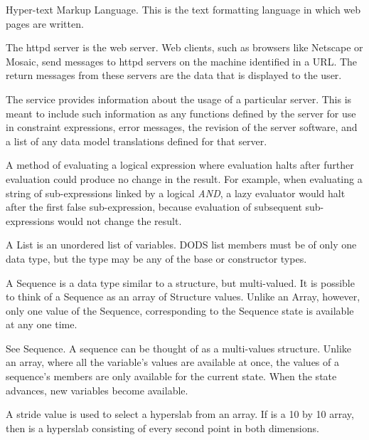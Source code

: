 Hyper-text Markup Language. This is the text formatting language in
which web pages are written.



The httpd server is the web server. Web clients, such as browsers like
Netscape or Mosaic, send messages to httpd servers on the machine
identified in a URL. The return messages from these servers are the
data that is displayed to the user.


The  service provides information about the usage of a
particular server.  This is meant to include such information as any
functions defined by the server for use in constraint expressions,
error messages, the revision of the server software, and a list of any
data model translations defined for that server.


A method of evaluating a logical expression where evaluation halts
after further evaluation could produce no change in the result. For
example, when evaluating a string of sub-expressions linked by a
logical {\em AND}, a lazy evaluator would halt after the first false
sub-expression, because evaluation of subsequent sub-expressions would
not change the result.


A List is an unordered list of variables. DODS list members must be of
only one data type, but the type may be any of the base or constructor
types.


A Sequence is a data type similar to a structure, but multi-valued. It
is possible to think of a Sequence as an array of Structure values.
Unlike an Array, however, only one value of the Sequence,
corresponding to the Sequence state is available at any one time.


See Sequence. A sequence can be thought of as a multi-values
structure. Unlike an array, where all the variable's values are
available at once, the values of a sequence's members are only
available for the current state. When the state advances, new
variables become available.


A stride value is used to select a hyperslab from an array. If 
is a 10 by 10 array, then  is a hyperslab
consisting of every second point in both dimensions.

